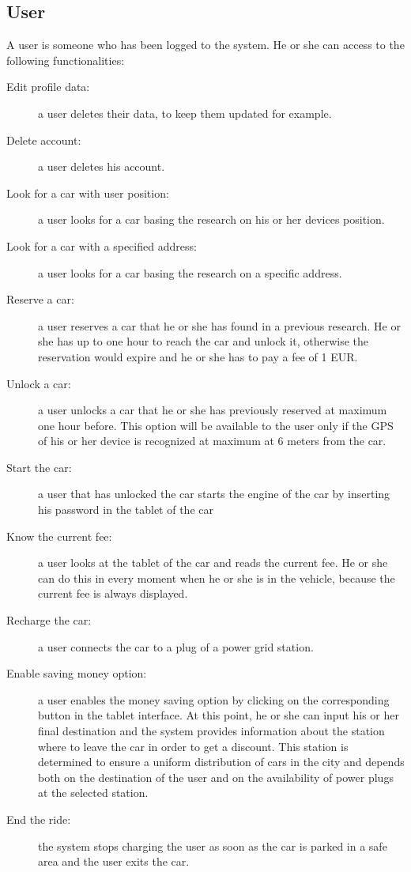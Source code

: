\subsection{User}
A user is someone who has been logged to the system. He or she can access to the following functionalities:
\begin{description}
\item[Edit profile data:] a user deletes their data, to keep them updated for example.
\item[Delete account:] a user deletes his account.
\item[Look for a car with user position:] a user looks for a car basing the research on his or her devices position.
\item[Look for a car with a specified address:] a user looks for a car basing the research on a specific address.
\item[Reserve a car:] a user reserves a car that he or she has found in a previous research. He or she has up to one hour to reach the car and unlock it, otherwise the reservation would expire and he or she has to pay a fee of 1 EUR.
\item[Unlock a car:] a user unlocks a car that he or she has previously reserved at maximum one hour before. This option will be available to the user only if the GPS of his or her device is recognized at maximum at 6 meters from the car.
\item[Start the car:] a user that has unlocked the car starts the engine of the car by inserting his password in the tablet of the car
\item[Know the current fee:] a user looks at the tablet of the car and reads the current fee. He or she can do this in every moment when he or she is in the vehicle, because the current fee is always displayed.
\item[Recharge the car:] a user connects the car to a plug of a power grid station.
\item[Enable saving money option:] a user enables the money saving option by clicking on the corresponding button in the tablet interface. At this point, he or she can input his or her final destination and the system provides information about the station where to leave the car in order to get a discount.
This station is determined to ensure a uniform distribution of cars in the city and depends both on the destination of the user and on the availability of power plugs at the selected station. 
\item[End the ride:] the system stops charging the user as soon as the car is parked in a safe area and the user exits the car.
\end{description}
